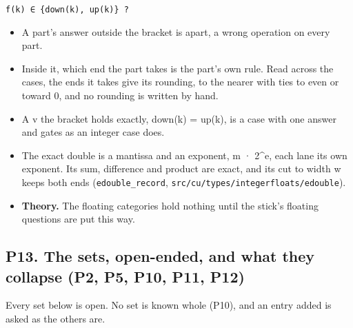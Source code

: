 \texttt{f(k) ∈ \{down(k), up(k)\} ?}

\begin{itemize}
\item A part's answer outside the bracket is apart, a wrong operation on every part.
\item Inside it, which end the part takes is the part's own rule. Read across the cases, the ends it takes give its rounding, to the nearer with ties to even or toward 0, and no rounding is written by hand.
\item A v the bracket holds exactly, down(k) = up(k), is a case with one answer and gates as an integer case does.
\item The exact double is a mantissa and an exponent, m · 2\textasciicircum{}e, each lane its own exponent. Its sum, difference and product are exact, and its cut to width w keeps both ends (\texttt{edouble\_\allowbreak{}record}, \texttt{src/\allowbreak{}cu/\allowbreak{}types/\allowbreak{}integerfloats/\allowbreak{}edouble}).
\item \textbf{Theory.} The floating categories hold nothing until the stick's floating questions are put this way.
\end{itemize}

\subsection{\texorpdfstring{P13. The sets, open-ended, and what they collapse (P2, P5, P10, P11, P12)}{P13. The sets, open-ended, and what they collapse (P2, P5, P10, P11, P12)}}

Every set below is open. No set is known whole (P10), and an entry added is asked as the others are.

